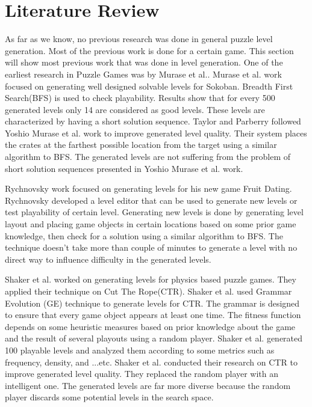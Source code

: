 \documentclass[letterpaper]{article}
\begin{document}
\section{Literature Review}
As far as we know, no previous research was done in general puzzle level generation. Most of the previous work is done for a certain game. This section will show most previous work that was done in level generation. One of the earliest research in Puzzle Games was by Murase et al.\cite{sokobanLevelGenerationOld}. Murase et al. work focused on generating well designed solvable levels for Sokoban\cite{sokoban}. Breadth First Search(BFS) is used to check playability. Results show that for every 500 generated levels only 14 are considered as good levels. These levels are characterized by having a short solution sequence. Taylor and Parberry\cite{sokobanLevelGenerationNew} followed Yoshio Murase et al. work\cite{sokobanLevelGenerationOld} to improve generated level quality. Their system places the crates at the farthest possible location from the target using a similar algorithm to BFS. The generated levels are not suffering from the problem of short solution sequences presented in Yoshio Murase et al. work\cite{sokobanLevelGenerationOld}.\\\par

Rychnovsky\cite{fruitDatingPCG} work focused on generating levels for his new game Fruit Dating\cite{fruitDating}. Rychnovsky developed a level editor that can be used to generate new levels or test playability of certain level. Generating new levels is done by generating level layout and placing game objects in certain locations based on some prior game knowledge, then check for a solution using a similar algorithm to BFS. The technique doesn't take more than couple of minutes to generate a level with no direct way to influence difficulty in the generated levels.\\\par

Shaker et al.\cite{ctrAutomaticGeneration} worked on generating levels for physics based puzzle games. They applied their technique on Cut The Rope(CTR)\cite{cutTheRope}. Shaker et al. used Grammar Evolution (GE) technique to generate levels for CTR. The grammar is designed to ensure that every game object appears at least one time. The fitness function depends on some heuristic measures based on prior knowledge about the game and the result of several playouts using a random player. Shaker et al. generated 100 playable levels and analyzed them according to some metrics such as frequency, density, and ...etc. Shaker et al.\cite{ctrSimulationApproach} conducted their research on CTR to improve generated level quality. They replaced the random player with an intelligent one. The generated levels are far more diverse because the random player discards some potential levels in the search space.\\\par
\end{document}
